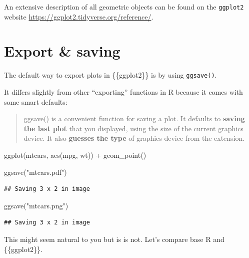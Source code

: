 \documentclass[]{book}
\newenvironment{Shaded}{}{}
\newcommand{\KeywordTok}[1]{\textcolor[rgb]{0.00,0.00,1.00}{#1}}
\newcommand{\NormalTok}[1]{#1}
\newcommand{\OperatorTok}[1]{#1}
\newcommand{\StringTok}[1]{\textcolor[rgb]{0.00,0.50,0.50}{#1}}
\begin{document}
An extensive description of all geometric objects can be found on the \texttt{ggplot2} website \url{https://ggplot2.tidyverse.org/reference/}.

\hypertarget{export-saving}{%
\section{Export \& saving}\label{export-saving}}

The default way to export plots in \{\{ggplot2\}\} is by using \texttt{ggsave()}.

It differs slightly from other ``exporting'' functions in R because it comes with some smart defaults:

\begin{quote}
ggsave() is a convenient function for saving a plot. It defaults to \textbf{saving the last plot} that you displayed, using the size of the current graphics device. It also \textbf{guesses the type} of graphics device from the extension.
\end{quote}

\begin{Shaded}
\begin{Highlighting}[]
\KeywordTok{ggplot}\NormalTok{(mtcars, }\KeywordTok{aes}\NormalTok{(mpg, wt)) }\OperatorTok{+}\StringTok{ }
\StringTok{  }\KeywordTok{geom_point}\NormalTok{()}
\end{Highlighting}
\end{Shaded}

\begin{Shaded}
\begin{Highlighting}[]
\KeywordTok{ggsave}\NormalTok{(}\StringTok{"mtcars.pdf"}\NormalTok{)}
\end{Highlighting}
\end{Shaded}

\begin{verbatim}
## Saving 3 x 2 in image
\end{verbatim}

\begin{Shaded}
\begin{Highlighting}[]
\KeywordTok{ggsave}\NormalTok{(}\StringTok{"mtcars.png"}\NormalTok{)}
\end{Highlighting}
\end{Shaded}

\begin{verbatim}
## Saving 3 x 2 in image
\end{verbatim}

This might seem natural to you but is is not.
Let's compare base R and \{\{ggplot2\}\}.
\end{document}
